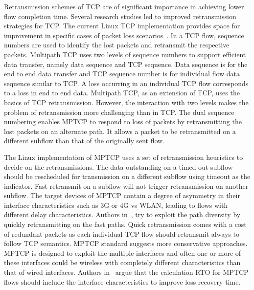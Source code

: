 \documentclass[10pt,conference,compsoc]{IEEEtran}
\begin{document}
Retransmission schemes of TCP are of significant importance in achieving lower flow completion time. Several research studies led to improved retransmission strategies for TCP. The current Linux TCP implementation provides space for improvement in specific cases of packet loss scenarios~\cite{prr}. In a TCP flow, sequence numbers are used to identify the lost packets and retransmit the respective packets. Multipath TCP uses two levels of sequence numbers to support efficient data transfer, namely data sequence and TCP sequence. Data sequence is for the end to end data transfer and TCP sequence number is for individual flow data sequence similar to TCP. A loss occurring in an individual TCP flow corresponds to a loss in end to end data. Multipath TCP, as an extension of TCP, uses the basics of TCP retransmission. However, the interaction with two levels makes the problem of retransmission more challenging than in TCP. The dual sequence numbering enables MPTCP to respond to loss of packets by retransmitting the lost packets on an alternate path. It allows a packet to be retransmitted on a different subflow than that of the originally sent flow. 

The Linux implementation of MPTCP uses a set of retransmission heuristics to decide on the retransmissions. The data outstanding on a timed out subflow should be rescheduled for transmission on a different subflow using timeout as the indicator. Fast retransmit on a subflow will not trigger retransmission on another subflow. The target devices of MPTCP contain a degree of asymmetry in their interface characteristics such as 3G or 4G vs WLAN, leading to flows with different delay characteristics. Authors in~\cite{fuso}, try to exploit the path diversity by quickly retransmitting on the fast paths. Quick retransmission comes with a cost of redundant packets as each individual TCP flow should retransmit always to follow TCP semantics. MPTCP standard suggests more conservative approaches. MPTCP is designed to exploit the multiple interfaces and often one or more of these interfaces could be wireless with completely different characteristics than that of wired interfaces. Authors in~\cite{Shin} argue that the calculation RTO for MPTCP flows should include the interface characteristics to improve loss recovery time. 


\end{document}
